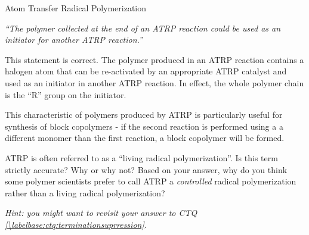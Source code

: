 \begin{activity}{Atom Transfer Radical Polymerization}
\begin{ctqs}
\begin{enumerate}
				\emph{``The polymer collected at the end of an ATRP reaction could be used as an initiator for another ATRP reaction.''}
				
				\begin{solution}[2in]
				
					This statement is correct. The polymer produced in an ATRP reaction contains a halogen atom that can be re-activated by an appropriate ATRP catalyst and used as an initiator in another ATRP reaction.  In effect, the whole polymer chain is the ``R'' group on the initiator.
					
					This characteristic of polymers produced by ATRP is particularly useful for synthesis of block copolymers - if the second reaction is performed using a a different monomer than the first reaction, a block copolymer will be formed.
				
				\end{solution}
				
		\end{enumerate}
		
		
		
		
\end{ctqs}


\begin{exercises}

	\exercise ATRP is often referred to as a ``living radical polymerization''.  Is this term strictly accurate?  Why or why not?  Based on your answer, why do you think some polymer scientists prefer to call ATRP a \emph{controlled} radical polymerization rather than a living radical polymerization?
	
		\emph{Hint: you might want to revisit your answer to CTQ \ref{\labelbase:ctq:terminationsuprression}.}
		
		\begin{solution}\end{solution}		
		

\end{exercises}
\end{activity}
